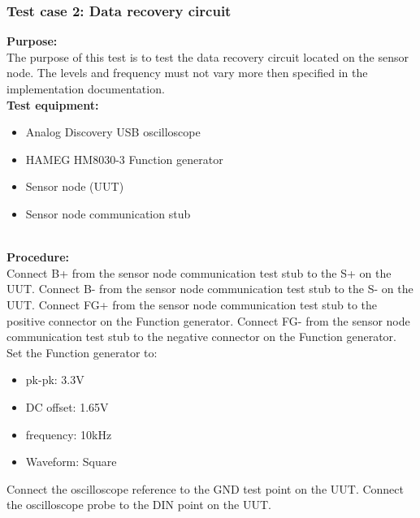 \subsubsection{Test case 2: Data recovery circuit}
\textbf{Purpose:}\\
The purpose of this test is to test the data recovery circuit located on the sensor node.  The levels and frequency must not vary more then specified in the implementation documentation.\\

\textbf{Test equipment:}
\begin{itemize}
\item Analog Discovery USB oscilloscope
\item HAMEG HM8030-3 Function generator
\item Sensor node (UUT)
\item Sensor node communication stub
\end{itemize}
\ \\
\textbf{Procedure:}\\
Connect B+ from the sensor node communication test stub to the S+ on the UUT. Connect B- from the sensor node communication test stub to the S- on the UUT.
Connect FG+ from the sensor node communication test stub to the positive connector on the Function generator. Connect FG- from the sensor node communication test stub to the negative connector on the Function generator.\\ Set the Function generator to:
\begin{itemize}
\item pk-pk: 3.3V
\item DC offset: 1.65V
\item frequency: 10kHz
\item Waveform: Square
\end{itemize}
Connect the oscilloscope reference to the GND test point on the UUT.
Connect the oscilloscope probe to the DIN point on the UUT.\\
